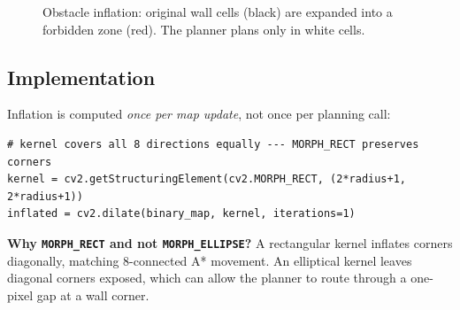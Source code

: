 \documentclass[12pt,a4paper]{article}
\begin{document}
\begin{figure}[h]
\centering
{}
\caption{Obstacle inflation: original wall cells (black) are expanded into
  a forbidden zone (red). The planner plans only in white cells.}
\label{fig:inflation}
\end{figure}

\subsection{Implementation}

Inflation is computed \emph{once per map update}, not once per planning call:

\begin{lstlisting}[style=python, caption={Inflation in map\_callback (main.py)}]
# kernel covers all 8 directions equally --- MORPH_RECT preserves corners
kernel = cv2.getStructuringElement(cv2.MORPH_RECT, (2*radius+1, 2*radius+1))
inflated = cv2.dilate(binary_map, kernel, iterations=1)
\end{lstlisting}

\begin{tcolorbox}[notebox]
  \textbf{Why \texttt{MORPH\_RECT} and not \texttt{MORPH\_ELLIPSE}?}
  A rectangular kernel inflates corners diagonally, matching 8-connected
  A* movement. An elliptical kernel leaves diagonal corners exposed, which
  can allow the planner to route through a one-pixel gap at a wall corner.
\end{tcolorbox}
\end{document}

